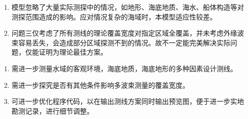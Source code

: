 
\begin{enumerate}
    \item 模型忽略了大量实际测探中的情况，如地形、海底地质、海水、船体构造等对测探范围造成的影响。应对情况复杂的海域时，本模型适应性较差。
    \item 问题三仅考虑了所有测线的理论覆盖宽度对指定区域全覆盖，并未考虑外缘波束容易丢失，会造成部分区域探测不到的情况。故不一定能完美解决实际问题，仅能证明为理论最佳方案。
\end{enumerate}


\begin{enumerate}
    \item 需进一步测量水域的客观环境，海底地质，海底地形的多种因素设计测线。
    \item 需进一步探究是否有其他条件影响多波束测量的覆盖宽度。
    \item 可进一步优化程序代码，以在输出测线方案同时输出预览图，便于进一步实地勘测记录，进行细节调整。
\end{enumerate}